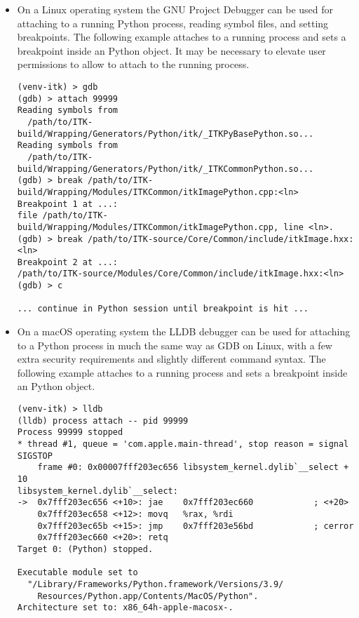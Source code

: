 \begin{enumerate}
\begin{itemize}
\item On a Linux operating system the GNU Project Debugger  can be used
for attaching to a running Python process, reading symbol files, and setting breakpoints.
The following example attaches to a running process and sets a breakpoint inside
an  Python object. It may be necessary to elevate user permissions
to allow  to attach to the running process.

\begin{verbatim}
(venv-itk) > gdb
(gdb) > attach 99999
Reading symbols from
  /path/to/ITK-build/Wrapping/Generators/Python/itk/_ITKPyBasePython.so...
Reading symbols from
  /path/to/ITK-build/Wrapping/Generators/Python/itk/_ITKCommonPython.so...
(gdb) > break /path/to/ITK-build/Wrapping/Modules/ITKCommon/itkImagePython.cpp:<ln>
Breakpoint 1 at ...:
file /path/to/ITK-build/Wrapping/Modules/ITKCommon/itkImagePython.cpp, line <ln>.
(gdb) > break /path/to/ITK-source/Core/Common/include/itkImage.hxx:<ln>
Breakpoint 2 at ...:
/path/to/ITK-source/Modules/Core/Common/include/itkImage.hxx:<ln>
(gdb) > c

... continue in Python session until breakpoint is hit ...
\end{verbatim}

\item On a macOS operating system the LLDB debugger can be used for attaching to a
Python process in much the same way as GDB on Linux, with a few extra security
requirements and slightly different command syntax. The following example
attaches to a running process and sets a breakpoint inside an 
Python object.

\begin{verbatim}
(venv-itk) > lldb
(lldb) process attach -- pid 99999
Process 99999 stopped
* thread #1, queue = 'com.apple.main-thread', stop reason = signal SIGSTOP
    frame #0: 0x00007fff203ec656 libsystem_kernel.dylib`__select + 10
libsystem_kernel.dylib`__select:
->  0x7fff203ec656 <+10>: jae    0x7fff203ec660            ; <+20>
    0x7fff203ec658 <+12>: movq   %rax, %rdi
    0x7fff203ec65b <+15>: jmp    0x7fff203e56bd            ; cerror
    0x7fff203ec660 <+20>: retq
Target 0: (Python) stopped.

Executable module set to
  "/Library/Frameworks/Python.framework/Versions/3.9/
    Resources/Python.app/Contents/MacOS/Python".
Architecture set to: x86_64h-apple-macosx-.


\end{verbatim}
\end{itemize}
\end{enumerate}
